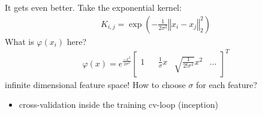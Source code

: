 

It gets even better. Take the exponential kernel:
\begin{align*}
K_{i,j} = \exp\left(-\frac{1}{2\sigma^2}\left\Vert x_i-x_j \right\Vert_2^2 \right)
\end{align*}
What is $\varphi(x_i)$ here? 
\pause{}
\begin{align*}
\varphi(x) = e^{\frac{-x^2}{2\sigma^2}}\begin{bmatrix} 1 &
&{\frac{1}{\sigma}}x &\sqrt{\frac{1}{2!\sigma^4}}x^2 &\hdots\end{bmatrix}^T
\end{align*}
infinite dimensional feature space!
How to choose $\sigma$ for each feature?
\pause{}
\begin{itemize}
\item cross-validation inside the training cv-loop (inception) 
\end{itemize}
